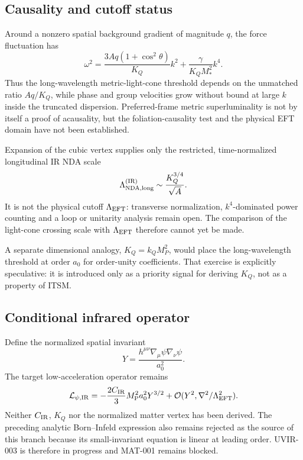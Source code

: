 \subsection{Causality and cutoff status}

Around a nonzero spatial background gradient of magnitude $q$, the force
fluctuation has
\begin{equation}
 \omega^2=\frac{3Aq(1+\cos^2\theta)}{K_Q}k^2
 +\frac{\gamma}{K_QM_*^2}k^4.
 \label{eq:force-dispersion}
\end{equation}
Thus the long-wavelength metric-light-cone threshold depends on the unmatched
ratio $Aq/K_Q$, while phase and group velocities grow without bound at large
$k$ inside the truncated dispersion.  Preferred-frame metric superluminality
is not by itself a proof of acausality, but the foliation-causality test and the
physical EFT domain have not been established.

Expansion of the cubic vertex supplies only the restricted, time-normalized
longitudinal IR NDA scale
\begin{equation}
 \Lambda_{\rm NDA,long}^{\rm (IR)}\sim\frac{K_Q^{3/4}}{\sqrt A}.
 \label{eq:long-nda}
\end{equation}
It is not the physical cutoff $\Lambda_{\rm EFT}$: transverse normalization,
$k^4$-dominated power counting and a loop or unitarity analysis remain open.
The comparison of the light-cone crossing scale with $\Lambda_{\rm EFT}$
therefore cannot yet be made.

A separate dimensional analogy, $K_Q=k_QM_P^2$, would place the
long-wavelength threshold at order $a_0$ for order-unity coefficients.  That
exercise is explicitly speculative: it is introduced only as a priority
signal for deriving $K_Q$, not as a property of ITSM.

\subsection{Conditional infrared operator}

Define the normalized spatial invariant
\begin{equation}
 Y=\frac{h^{\mu\nu}\nabla_\mu\psi\nabla_\nu\psi}{a_0^2}.
 \label{eq:Y}
\end{equation}
The target low-acceleration operator remains
\begin{equation}
 \mathcal L_{\psi,\rm IR}
 =-\frac{2C_{\rm IR}}{3}M_{\mathrm P}^2a_0^2Y^{3/2}
 +\mathcal O(Y^2,\nabla^2/\Lambda_{\rm EFT}^2).
 \label{eq:ir-action}
\end{equation}
Neither $C_{\rm IR}$, $K_Q$ nor the normalized matter vertex has been derived.
The preceding analytic Born--Infeld expression also remains rejected as the
source of this branch because its small-invariant equation is linear at
leading order.  UVIR-003 is therefore in progress and MAT-001 remains blocked.
